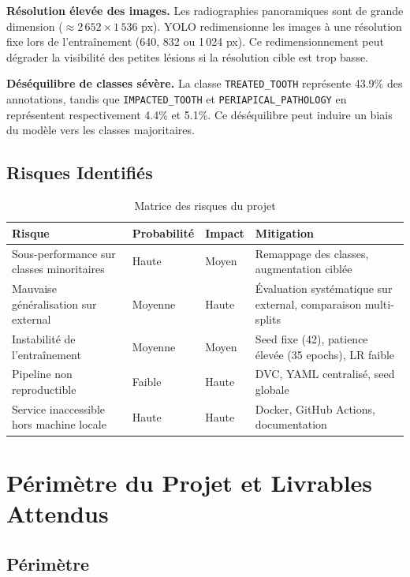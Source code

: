 \documentclass{rapportENSIAS}
\begin{document}
\textbf{Résolution élevée des images.} Les radiographies panoramiques sont de grande dimension ($\approx 2\,652 \times 1\,536$ px). YOLO redimensionne les images à une résolution fixe lors de l'entraînement (640, 832 ou 1\,024 px). Ce redimensionnement peut dégrader la visibilité des petites lésions si la résolution cible est trop basse.

\textbf{Déséquilibre de classes sévère.} La classe \texttt{TREATED\_TOOTH} représente 43.9\% des annotations, tandis que \texttt{IMPACTED\_TOOTH} et \texttt{PERIAPICAL\_PATHOLOGY} en représentent respectivement 4.4\% et 5.1\%. Ce déséquilibre peut induire un biais du modèle vers les classes majoritaires.

\subsection{Risques Identifiés}

\begin{table}[H]
\centering
\caption{Matrice des risques du projet}
\label{tab:risques}
\begin{tabular}{p{4.5cm} p{3cm} p{3cm} p{3.5cm}}
\toprule
\textbf{Risque} & \textbf{Probabilité} & \textbf{Impact} & \textbf{Mitigation} \\
\midrule
Sous-performance sur classes minoritaires & Haute & Moyen & Remappage des classes, augmentation ciblée \\
Mauvaise généralisation sur external & Moyenne & Haute & Évaluation systématique sur external, comparaison multi-splits \\
Instabilité de l'entraînement & Moyenne & Moyen & Seed fixe (42), patience élevée (35 epochs), LR faible \\
Pipeline non reproductible & Faible & Haute & DVC, YAML centralisé, seed globale \\
Service inaccessible hors machine locale & Haute & Haute & Docker, GitHub Actions, documentation \\
\bottomrule
\end{tabular}
\end{table}

\section{Périmètre du Projet et Livrables Attendus}

\subsection{Périmètre}
\end{document}
